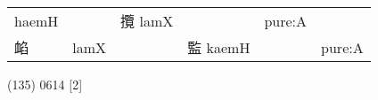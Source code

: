 \documentclass[14pt,a4paper]{scrartcl}
\begin{document}
\begin{longtable}[c]{@{}llllll@{}}
\begin{minipage}[t]{0.14\columnwidth}\raggedright\strut
haemH
\strut\end{minipage} &
\begin{minipage}[t]{0.14\columnwidth}\raggedright\strut
\strut\end{minipage} &
\begin{minipage}[t]{0.14\columnwidth}\raggedright\strut
攬 lamX
\strut\end{minipage} &
\begin{minipage}[t]{0.14\columnwidth}\raggedright\strut
\strut\end{minipage} &
\begin{minipage}[t]{0.14\columnwidth}\raggedright\strut
pure:A
\strut\end{minipage}\tabularnewline
\begin{minipage}[t]{0.14\columnwidth}\raggedright\strut
䘓
\strut\end{minipage} &
\begin{minipage}[t]{0.14\columnwidth}\raggedright\strut
lamX
\strut\end{minipage} &
\begin{minipage}[t]{0.14\columnwidth}\raggedright\strut
\strut\end{minipage} &
\begin{minipage}[t]{0.14\columnwidth}\raggedright\strut
監 kaemH
\strut\end{minipage} &
\begin{minipage}[t]{0.14\columnwidth}\raggedright\strut
\strut\end{minipage} &
\begin{minipage}[t]{0.14\columnwidth}\raggedright\strut
pure:A
\strut\end{minipage}\tabularnewline
\bottomrule
\end{longtable}

(135) 0614 {[}2{]}
\end{document}
